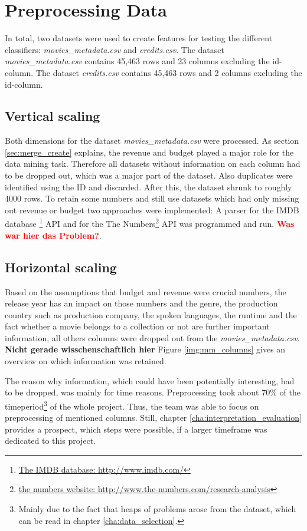 \chapter{Preprocessing Data}
\label{cha:preprocessing}

In total, two datasets were used to create features for testing the different classifiers:
\textit{movies\_metadata.csv} and \textit{credits.csv}. The dataset \textit{movies\_metadata.csv} contains 45,463 rows and 23 columns excluding the id-column. The dataset \textit{credits.csv} contains 45,463 rows and 2 columns excluding the id-column.

\section{Vertical scaling}
Both dimensions for the dataset \textit{movies\_metadata.csv} were processed. As section \ref{sec:merge_create} explains, the revenue and budget played a major role for the data mining task. Therefore all datasets without information on each column had to be dropped out, which was a major part of the dataset. Also duplicates were identified using the ID and discarded. After this, the dataset shrunk to roughly 4000 rows. To retain some numbers and still use datasets which had only missing out revenue or budget two approaches were implemented: A parser for the IMDB database \footnote{
\hyperref{http://www.imdb.com/}{external_sources}{ref:IMDB}{The IMDB database: http://www.imdb.com/}} API and for the The Numbers\footnote{\hyperref{http://www.the-numbers.com/research-analysis}{external_sources}{ref:numbers}{the numbers website: http://www.the-numbers.com/research-analysis}} API was programmed and run.
{\textcolor{red}{\textbf{Was war hier das Problem?}}}.

\section{Horizontal scaling}
Based on the assumptions that budget and revenue were crucial numbers, the release year has an impact on those numbers and the genre, the production country such as production company, the spoken languages, the runtime and the fact whether a movie belongs to a collection or not are further important information, all others columns were dropped out from the \textit{movies\_metadata.csv}. \textbf{Nicht gerade wisschenschaftlich hier} Figure \ref{img:mm_columns} gives an overview on which information was retained.

The reason why information, which could have been potentially interesting, had to be dropped, was mainly for time reasons. Preprocessing took about 70\% of the timeperiod\footnote{Mainly due to the fact that heaps of problems arose from the dataset, which can be read in chapter \ref{cha:data_selection}.} of the whole project. Thus, the team was able to focus on preprocessing of mentioned columns. Still, chapter \ref{cha:interpretation_evaluation} provides a prospect, which steps were possible, if a larger timeframe was dedicated to this project.

